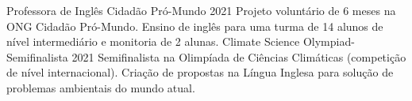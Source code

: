 \documentclass[11pt]{spidercv}
\begin{document}
\begin{MainPart}
        \vspace*{0.1cm}
    \Experience
        {\ColorHighlight}
		{Professora de Inglês}
		{Cidadão Pró-Mundo}
        {2021}
        {Projeto voluntário de 6 meses na ONG Cidadão Pró-Mundo. Ensino de inglês para uma turma de 14 alunos de nível intermediário e monitoria de 2 alunas.}
        \vspace*{0.1cm}
    \Experience
        {\ColorHighlight}
		{Climate Science Olympiad- Semifinalista}
		{}
        {2021}
        {Semifinalista na Olimpíada de Ciências Climáticas (competição de nível internacional). Criação de propostas na Língua Inglesa para solução de problemas ambientais do mundo atual.}

    \end{MainPart}


    


    
\end{document}
